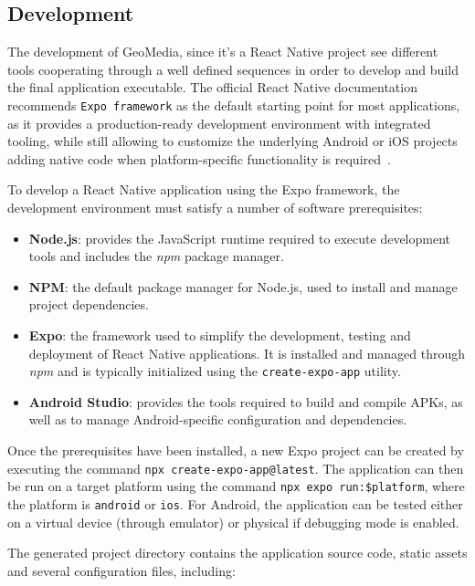 \subsection{Development}

The development of GeoMedia, since it's a React Native project see different tools cooperating through a well defined sequences in order to develop and build the final application executable. The official React Native documentation recommends \texttt{Expo framework} as the default starting point for most applications, as it provides a production-ready development environment with integrated tooling, while still allowing to customize the underlying Android or iOS projects adding native code when platform-specific functionality is required~\cite{site:expo-native}.

To develop a React Native application using the Expo framework, the development environment must satisfy a number of software prerequisites:

\begin{itemize}
    \item \textbf{Node.js}: provides the JavaScript runtime required to execute development tools and includes the \textit{npm} package manager.
    \item \textbf{NPM}: the default package manager for Node.js, used to install and manage project dependencies.
    \item \textbf{Expo}: the framework used to simplify the development, testing and deployment of React Native applications. It is installed and managed through \textit{npm} and is typically initialized using the \texttt{create-expo-app} utility.
    \item \textbf{Android Studio}: provides the tools required to build and compile APKs, as well as to manage Android-specific configuration and dependencies.
\end{itemize}

Once the prerequisites have been installed, a new Expo project can be created by executing the command \texttt{npx create-expo-app@latest}. The application can then be run on a target platform using the command \texttt{npx expo run:\$platform}, where the platform is \texttt{android} or \texttt{ios}. For Android, the application can be tested either on a virtual device (through emulator) or physical if debugging mode is enabled.

The generated project directory contains the application source code, static assets and several configuration files, including:

